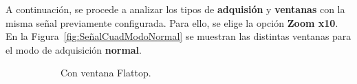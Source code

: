     A continuación, se procede a analizar los tipos de \textbf{adquisión} y \textbf{ventanas} con la misma señal
    previamente configurada. Para ello, se elige la opción \textbf{Zoom x10}. En la Figura~\ref{fig:SeñalCuadModoNormal}
    se muestran las distintas ventanas para el modo de adquisición \textbf{normal}.

    \begin{figure}[H]
      \centering
      \begin{subfigure}[H]{0.40\textwidth}
        \caption{Con ventana Flattop.}
      \end{subfigure}
      \hfill 
      \begin{subfigure}[H]{0.39\textwidth}

\end{subfigure}
\end{figure}
